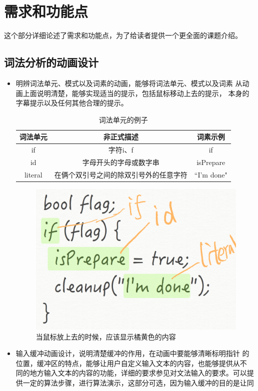 \section{需求和功能点}
这个部分详细论述了需求和功能点，为了给读者提供一个更全面的课题介绍。

\subsection{词法分析的动画设计}
\begin{itemize}
\item 明辨词法单元、模式以及词素的动画，能够将词法单元、模式以及词素
  从动画上面说明清楚，能够实现适当的提示，包括鼠标移动上去的提示，
  本身的字幕提示以及任何其他合理的提示。
  \begin{table}[!hbp]
  	\centering
  	\begin{tabular}{c|c|c}
  		\hline
  		词法单元 & 非正式描述 & 词素示例\\
  		\hline
  		if & 字符i、f & if\\
  		\hline
  		id & 字母开头的字母或数字串 & isPrepare\\
  		\hline
  		literal & 在俩个双引号之间的除双引号外的任意字符 & ``I'm done"\\
		\hline
  	\end{tabular}
  	\caption{词法单元的例子}
  \end{table}
  \begin{figure}[!htb]
  	\centering
  	\includegraphics[width=0.7\linewidth]{img/lexical.png}
  	\caption{当鼠标放上去的时候，应该显示橘黄色的内容}
  	\label{fig:lexical.png}
  \end{figure}
\item 输入缓冲动画设计，说明清楚缓冲的作用，在动画中要能够清晰标明指针
  的位置，缓冲区的特点，能够让用户自定义输入文本的内容，也能够提供从不
  同的地方输入文本的内容的功能，详细的要求参见对文法输入的要求。可以提
  供一定的算法步骤，进行算法演示，这部分可选，因为输入缓冲的目的是让同

\end{itemize}
